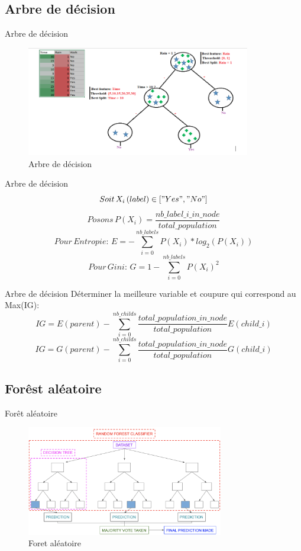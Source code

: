 \documentclass[xelatex,12pt]{beamer}
\begin{document}
\subsection{Arbre de décision}
\begin{frame}{Arbre de décision}
	\begin{figure}[H]
    \includegraphics[width=\linewidth, height=4.8cm]{images/decision_tree_formular.png}
    \caption{Arbre de décision}
    \label{fig:L1}
\end{figure}
\end{frame}
\begin{frame}{Arbre de décision}
 $$ Soit \, X_i \,(label) \in ["Yes","No"] $$
$$ Posons\, P(X_i) = \frac{nb\_label\_i\_in\_node}{total\_population}$$
$$ Pour\,Entropie:\, E = - \sum_{i=0}^{nb\_labels} P(X_i) * log_2(P(X_i))$$ 
$$ Pour\,Gini:\, G = 1 - \sum_{i=0}^{nb\_labels} P(X_i)^2$$ 
\end{frame}
\begin{frame}{Arbre de décision} 
Déterminer la meilleure variable et coupure qui correspond au Max(IG):
$$IG = E(parent) - \sum_{i=0}^{nb\_childs} \frac{total\_population\_in\_node}{total\_population}E(child\_i)$$
$$IG = G(parent) - \sum_{i=0}^{nb\_childs} \frac{total\_population\_in\_node}{total\_population}G(child\_i)$$
\end{frame}

\subsection{Forêst aléatoire}
\begin{frame}{Forêt aléatoire}
	\begin{figure}[H]
    \includegraphics[width=\linewidth, height=4.8cm]{images/random-forest-classifier.png}
    \caption{Foret aléatoire}
    \label{fig:L1}
\end{figure}
\end{frame}
\end{document}
